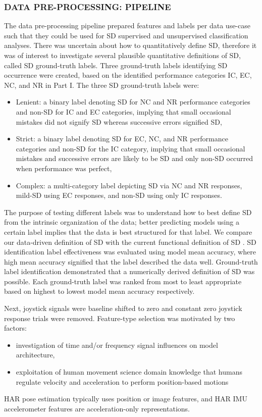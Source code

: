 \documentclass{ieeeaccess}
\begin{document}
\subsubsection{DATA PRE-PROCESSING: PIPELINE}
The data pre-processing pipeline prepared features and labels per data use-case such that they could be used for SD supervised and unsupervised classification analyses. There was uncertain about how to quantitatively define SD, therefore it was of interest to investigate several plausible quantitative definitions of SD, called SD ground-truth labels. Three ground-truth labels identifying SD occurrence were created, based on the identified performance categories IC, EC, NC, and NR in Part I. The three SD ground-truth labels were:
\begin{itemize}
\item Lenient: a binary label denoting SD for NC and NR performance categories and non-SD for IC and EC categories, implying that small occasional mistakes did not signify SD whereas successive errors signified SD, 
\item Strict: a binary label denoting SD for EC, NC, and NR performance categories and non-SD for the IC category, implying that small occasional mistakes and successive errors are likely to be SD and only non-SD occurred when performance was perfect,
\item Complex: a multi-category label depicting SD via NC and NR responses, mild-SD using EC responses, and non-SD using only IC responses.
\end{itemize}
The purpose of testing different labels was to understand how to best define SD from the intrinsic organization of the data; better predicting models using a certain label implies that the data is best structured for that label. We compare our data-driven definition of SD with the current functional definition of SD \cite{Newman_2007_SD}. SD identification label effectiveness was evaluated using model mean accuracy, where high mean accuracy signified that the label described the data well. Ground-truth label identification demonstrated that a numerically derived definition of SD was possible. Each ground-truth label was ranked from most to least appropriate based on highest to lowest model mean accuracy respectively.

Next, joystick signals were baseline shifted to zero and constant zero joystick response trials were removed. Feature-type selection was motivated by two factors: 
\begin{itemize}
\item investigation of time and/or frequency signal influences on model architecture,
\item exploitation of human movement science domain knowledge that humans regulate velocity and acceleration to perform position-based motions
\end{itemize}
HAR pose estimation typically uses position or image features, and HAR IMU accelerometer features are acceleration-only representations\cite{}. 
\end{document}
